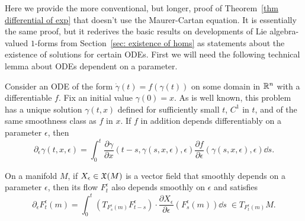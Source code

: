 Here we provide the more conventional, but longer, proof of Theorem~\ref{thm differential of exp} that doesn't use the Maurer-Cartan equation. It is essentially the same proof, but it rederives the basic results on developments of Lie algebra-valued $1$-forms from Section~\ref{sec: existence of homs} as statements about the existence of solutions for certain ODEs. First we will need the following technical lemma about ODEs dependent on a parameter.
\begin{lem}\label{lem variation formula}
    Consider an ODE of the form $\dot \gamma(t)=f(\gamma(t))$ on some domain in $\mathbb{R}^n$ with a differentiable $f$. Fix an initial value $\gamma(0)=x$. As is well known, this problem has a unique solution $\gamma(t,x)$ defined for sufficiently small $t$, $C^1$ in $t$, and of the same smoothness class as $f$ in $x$. If $f$ in addition depends differentiably on a parameter $\epsilon$, then 
    \[\partial_\epsilon \gamma(t,x,\epsilon)=\int_0^t \frac{\partial \gamma}{\partial x}(t-s,\gamma(s,x,\epsilon),\epsilon)\frac{\partial f}{\partial\epsilon}(\gamma(s,x,\epsilon),\epsilon)\dd s.\]

    On a manifold $M$, if $X_\epsilon\in \mathfrak{X}(M)$ is a vector field that smoothly depends on a parameter $\epsilon$, then its flow $F^\epsilon_t$ also depends smoothly on $\epsilon$ and satisfies
    \[\partial_\epsilon F^\epsilon_t(m)=\int_0^t\left(T_{F^\epsilon_s(m)}F^{\epsilon}_{t-s}\right)\cdot \frac{\partial X_\epsilon}{\partial \epsilon}\left(F^\epsilon_s(m)\right)\dd s\; \in T_{F^\epsilon_t(m)}M.\label{2702}\]
\end{lem}

